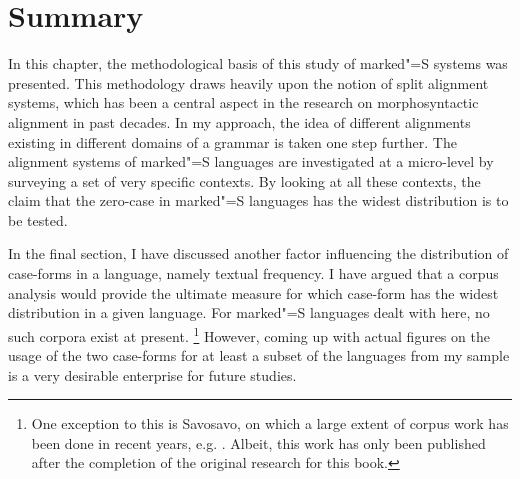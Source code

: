 \section{Summary}

In this chapter, the methodological basis of this study of marked"=S systems was presented.
This methodology draws heavily upon the notion of split alignment systems, which has been a central aspect in the research on morphosyntactic alignment in past decades.
In my approach, the idea of different alignments existing in different domains of a grammar is taken one step further.
The alignment systems of marked"=S languages are investigated at a micro-level by surveying a set of very specific contexts. 
By looking at all these contexts, the claim that the zero-case in marked"=S languages has the widest distribution is to be tested.

In the final section, I have discussed another factor influencing the distribution of case-forms in a language, namely textual frequency.
I have argued that a corpus analysis would provide the ultimate measure for which case-form has the widest distribution in a given language.
For marked"=S languages dealt with here, no such corpora exist at present.
\footnote{One exception to this is Savosavo, on which a large extent of corpus work has been done in recent years, e.g. \citet{Haig:2011}. 
Albeit, this work has only been published after the completion of the original research for this book.}  
However, coming up with actual figures on the usage of the two case-forms for at least a subset of the languages from my sample is a very desirable enterprise for future studies.





